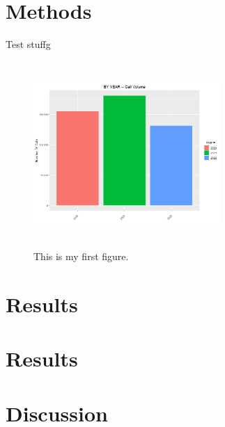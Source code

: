 \documentclass[12pt]{article}
\begin{document}
\section*{Methods}
Test stuffg
\begin{figure}[H]
    \centering
    \includegraphics[width=200pt,height=200pt]{By Year.png}
    \caption{This is my first figure.}
    \label{fig:Year}
  \end{figure}

\section*{Results}
\citep{avramidis2005modeling}
\citep{evensen1999effective}
\citep{ibrahim2016modeling}

\section*{Results}

\section*{Discussion}




\end{document}
